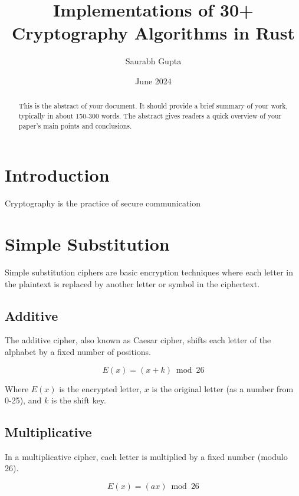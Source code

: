 \documentclass[12pt, letterpaper]{article}
\title{Implementations of 30+ Cryptography Algorithms in Rust}
\author{Saurabh Gupta}
\date{June 2024}
\begin{document}
\maketitle

\begin{abstract}

This is the abstract of your document.
It should provide a brief summary of your work,
typically in about 150-300 words.
The abstract gives readers a quick overview of 
your paper's main points and conclusions.

\end{abstract}

\tableofcontents
\pagebreak

\section{Introduction}

Cryptography is the practice of secure communication 

\pagebreak

\section{Simple Substitution}
Simple substitution ciphers are basic encryption techniques where each letter in the plaintext is replaced by another letter or symbol in the ciphertext.

\subsection{Additive}
The additive cipher, also known as Caesar cipher, shifts each letter of the alphabet by a fixed number of positions.

\begin{equation}
E(x) = (x + k) \bmod 26
\end{equation}

Where $E(x)$ is the encrypted letter, $x$ is the original letter (as a number from 0-25), and $k$ is the shift key.

\subsection{Multiplicative}
In a multiplicative cipher, each letter is multiplied by a fixed number (modulo 26).

\begin{equation}
E(x) = (ax) \bmod 26
\end{equation}
\end{document}
